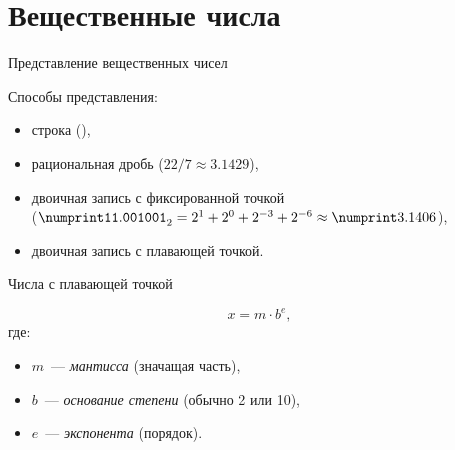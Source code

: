 \section{Вещественные числа}

\begin{frame}{Представление вещественных чисел}

  Способы представления:
  \begin{itemize}
      \pause
    \item строка (),
      \pause
    \item рациональная дробь ($22/7 \approx \num{3.1429}$),
      \pause
    \item двоичная запись с фиксированной точкой\\
      ($\bin{\num{11.001001}} = 2^1 + 2^0 + 2^{-3} + 2^{-6} \approx
        \num{3.1406}$),
      \pause
    \item двоичная запись с плавающей точкой.
  \end{itemize}

\end{frame}

\begin{frame}{Числа с плавающей точкой}


  {\Large \[ x = m \cdot b^e, \] }
  где:
  \begin{itemize}
    \item $m$~--- \emph{мантисса} (значащая часть),
    \item $b$~--- \emph{основание степени} (обычно 2 или 10),
    \item $e$~--- \emph{экспонента} (порядок).
  \end{itemize}

\end{frame}

